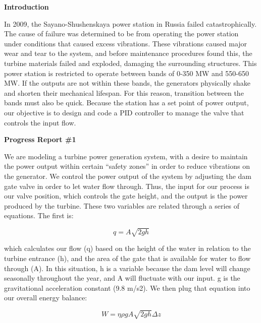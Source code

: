 \documentclass{article}
\begin{document}
    \begin{multicols*}{2}
        \begin{center}
            \textbf{Introduction}
        \end{center}

        In 2009, the Sayano-Shushenskaya power station in Russia failed catastrophically.  The cause of failure was determined to be from operating the power station under conditions that caused excess vibrations. These vibrations caused major wear and tear to the system, and before maintenance procedures found this, the turbine materials failed and exploded, damaging the surrounding structures.  This power station is restricted to operate between bands of 0-350 MW and 550-650 MW. If the outputs are not within these bands, the generators physically shake and shorten their mechanical lifespan.  For this reason, transition between the bands must also be quick. Because the station has a set point of power output, our objective is to design and code a PID controller to manage the valve that controls the input flow. 

        \begin{center}
            \textbf{Progress Report \#1}
        \end{center}

        We are modeling a turbine power generation system, with a desire to maintain the power output within certain “safety zones” in order to reduce vibrations on the generator. We control the power output of the system by adjusting the dam gate valve in order to let water flow through. Thus, the input for our process is our valve position, which controls the gate height, and the output is the power produced by the turbine. These two variables are related through a series of equations. The first is: 

        \begin{equation}
            q=A\sqrt{2gh}
        \end{equation}

        which calculates our flow (q) based on the height of the water in relation to the turbine entrance (h), and the area of the gate that is available for water to flow through (A). In this situation, h is a variable because the dam level will change seasonally throughout the year, and A will fluctuate with our input. g is the gravitational acceleration constant (9.8 m/s2). We then plug that equation into our overall energy balance:

        \begin{equation}
            W=\eta \rho gA\sqrt{2gh}\Delta z
        \end{equation}


\end{multicols*}
\end{document}

